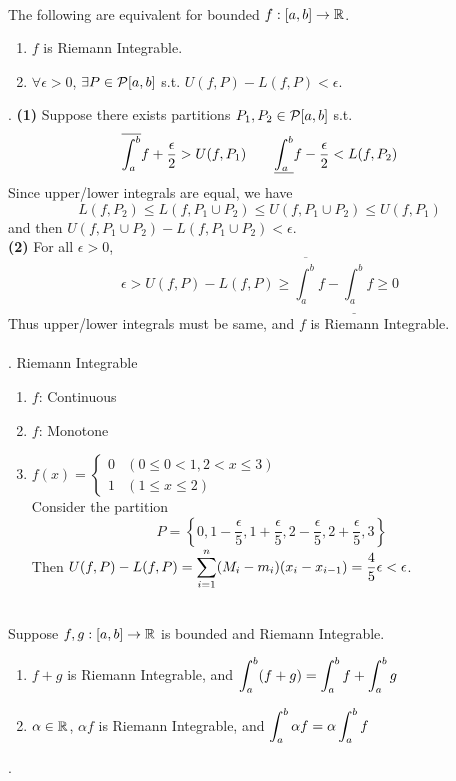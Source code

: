 \\
 The following are equivalent for bounded $f:[a, b]\rightarrow\mathbb{R}$.
\begin{enumerate}
	\item $f$ is Riemann Integrable.
	\item $\forall \epsilon>0$, $\exists P \in \mathcal{P}[a, b]$ s.t. $U(f, P) - L(f, P) < \epsilon$.
\end{enumerate}
\pf. \textbf{(1)} Suppose there exists partitions $P_1, P_2\in \mathcal{P}[a, b]$ s.t. $$\displaystyle \overline{\int_a^b}f+ \frac{\epsilon}{2} > U(f, P_1)\qquad \underline{\int_a^b}f - \frac{\epsilon}{2} < L(f, P_2)$$
Since upper/lower integrals are equal, we have
$$L(f, P_2) \leq L(f, P_1\cup P_2) \leq U(f, P_1\cup P_2)\leq U(f, P_1)$$
and then $U(f, P_1\cup P_2) - L(f, P_1\cup P_2) < \epsilon$.\\
\textbf{(2)} For all $\epsilon > 0$, $$\epsilon > U(f, P) - L(f, P) \geq \overline{\int_a^b}f - \underline{\int_a^b}f \geq 0$$
Thus upper/lower integrals must be same, and $f$ is Riemann Integrable.\\
\\
\ex. Riemann Integrable
\begin{enumerate}
	\item $f$: Continuous
	\item $f$: Monotone
	\item $f(x) = \begin{cases}
		0 & (0\leq 0 < 1, 2 < x \leq 3)\\ 1 & (1\leq x\leq 2)
	\end{cases}$\\
	Consider the partition $$P = \left\{0, 1-\frac{\epsilon}{5}, 1 + \frac{\epsilon}{5}, 2 - \frac{\epsilon}{5}, 2 + \frac{\epsilon}{5}, 3\right\}$$
	Then $U(f, P) - L(f, P) = \displaystyle \sum_{i=1}^n (M_i-m_i)(x_i - x_{i-1}) = \frac{4}{5}\epsilon < \epsilon$.
\end{enumerate}~\\
 Suppose $f, g:[a, b]\rightarrow\mathbb{R}$ is bounded and Riemann Integrable.
\begin{enumerate}
	\item $f+g$ is Riemann Integrable, and $\displaystyle \int_a^b (f+g) = \int_a^b f + \int_a^b g$
	\item $\alpha\in \mathbb{R}$, $\alpha f$ is Riemann Integrable, and $\displaystyle \int_a^b \alpha f = \alpha \int_a^b f$
\end{enumerate}
\pf.
